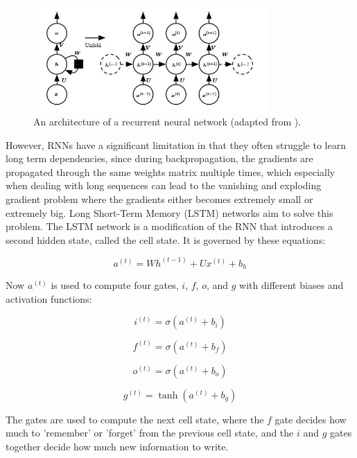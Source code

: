 \documentclass[11pt]{article}
\begin{document}
\begin{figure}[h]
\centering
\includegraphics[width=0.8\textwidth]{rnn_diagram.jpeg}
\caption{An architecture of a recurrent neural network (adapted from \cite{Goodfellow-et-al-2016}).}
\label{fig:rnn_diagram}
\end{figure}

However, RNNs have a significant limitation in that they often struggle to learn long term dependencies, since during backpropagation, the gradients are propagated through the same weights matrix multiple times, which especially when dealing with long sequences can lead to the vanishing and exploding gradient problem where the gradients either becomes extremely small or extremely big. Long Short-Term Memory (LSTM) networks  aim to solve this problem. The LSTM network is a modification of the RNN that introduces a second hidden state, called the cell state. It is governed by these equations:

\begin{equation} a^{(t)} = Wh^{(t-1)} + Ux^{(t)} + b_h\end{equation}

Now $a^{(t)}$ is used to compute four gates, $i$, $f$, $o$, and $g$ with different biases and activation functions:

\begin{equation} i^{(t)} = \sigma(a^{(t)} + b_i) \end{equation}

\begin{equation} f^{(t)} = \sigma(a^{(t)} + b_f) \end{equation}

\begin{equation} o^{(t)} = \sigma(a^{(t)} + b_o) \end{equation}

\begin{equation} g^{(t)} = \tanh(a^{(t)} + b_g) \end{equation}

The gates are used to compute the next cell state, where the $f$ gate decides how much to 'remember' or 'forget' from the previous cell state, and the $i$ and $g$ gates together decide how much new information to write.
\end{document}
